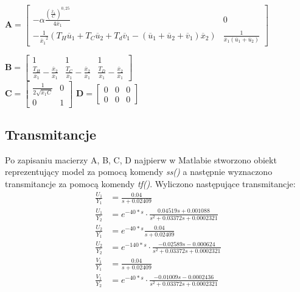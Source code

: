 \(\textbf{A}=\begin{bmatrix}
-\alpha \frac{(\frac{\overline{x}_1}{C})^{0,25}}{4\overline{x}_1} & 0\\
-\frac{1}{{\overline{x}_1}^2}(T_H\overline{u}_1+T_C\overline{u}_2+T_d\overline{v}_1-(\overline{u}_1+\overline{u}_2+\overline{v}_1)\overline{x}_2) & \frac{1}{\overline{x}_1(\overline{u}_1+\overline{u}_2)}
\end{bmatrix}\)

\(\textbf{B}=\begin{bmatrix}
1 & 1 & 1\\
\frac{T_H}{\overline{x}_1}-\frac{\overline{x}_2}{\overline{x}_1} & \frac{T_C}{\overline{x}_1}-\frac{\overline{x}_2}{\overline{x}_1} & \frac{T_D}{\overline{x}_1}-\frac{\overline{x}_2}{\overline{x}_1}
\end{bmatrix}\)\\

\(\textbf{C}=\begin{bmatrix}
\frac{1}{2\sqrt{\overline{x}_1C}} & 0\\
0 & 1
\end{bmatrix}\) \(\textbf{D}=\begin{bmatrix}
0 & 0 & 0\\
0 & 0 & 0
\end{bmatrix}\)\\



\newpage
\subsection{Transmitancje}

Po zapisaniu macierzy A, B, C, D najpierw w Matlabie stworzono obiekt reprezentujący model za pomocą komendy \emph{ss()} a następnie wyznaczono transmitancje za pomocą komendy \emph{tf()}. Wyliczono następujące transmitancje:
 \begin{align*}
\frac{U_1}{Y_1} &= \frac{0.04}{s + 0.02409} \\
\frac{U_1}{Y_2} &= e^{-40*s} \cdot \frac{0.04519 s + 0.001088}{s^2 + 0.03372 s + 0.0002321} \\
\frac{U_2}{Y_1} &= e^{-40*s}\frac{0.04}{s + 0.02409} \\
\frac{U_2}{Y_2} &= e^{-140*s} \cdot \frac{-0.02589 s - 0.000624}{s^2 + 0.03372 s + 0.0002321} \\
\frac{V_1}{Y_1} &= \frac{0.04}{s + 0.02409} \\
\frac{V_1}{Y_2} &= e^{-40*s} \cdot \frac{-0.01009 s - 0.0002436}{s^2 + 0.03372 s + 0.0002321} \\
 \end{align*}



